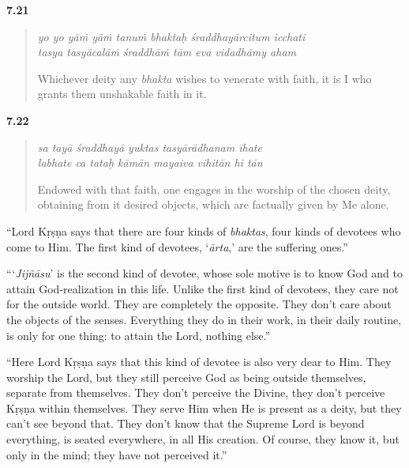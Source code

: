 \par\noindent\textbf{7.21}\par
\begin{verse}
\textit{yo yo yāṁ yāṁ tanuṁ bhaktaḥ śraddhayārcitum icchati} \\
\textit{tasya tasyācalāṁ śraddhāṁ tām eva vidadhāmy aham}

\noindent Whichever deity any \textit{bhakta} wishes to venerate with faith, it is I who grants them unshakable faith in it.
\end{verse}
\par



\par\noindent\textbf{7.22}\par
\begin{verse}
\textit{sa tayā śraddhayā yuktas tasyārādhanam īhate} \\
\textit{labhate ca tataḥ kāmān mayaiva vihitān hi tān}

\noindent Endowed with that faith, one engages in the worship of the chosen deity, obtaining from it desired objects, which are factually given by Me alone.
\end{verse}
\par



\enquote{Lord Kṛṣṇa says that there are four kinds of \textit{bhaktas}, four kinds of devotees who come to Him. The first kind of devotees, \enquote{\textit{ārta},} are the suffering ones.}

\enquote{\enquote{\textit{Jijñāsu}} is the second kind of devotee, whose sole motive is to know God and to attain God-realization in this life. Unlike the first kind of devotees, they care not for the outside world. They are completely the opposite. They don’t care about the objects of the senses. Everything they do in their work, in their daily routine, is only for one thing: to attain the Lord, nothing else.}

\enquote{Here Lord Kṛṣṇa says that this kind of devotee is also very dear to Him. They worship the Lord, but they still perceive God as being outside themselves, separate from themselves. They don’t perceive the Divine, they don’t perceive Kṛṣṇa within themselves. They serve Him when He is present as a deity, but they can’t see beyond that. They don’t know that the Supreme Lord is beyond everything, is seated everywhere, in all His creation. Of course, they know it, but only in the mind; they have not perceived it.}

